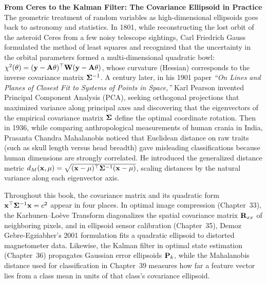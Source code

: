 \begin{applicationbox}
\textbf{From Ceres to the Kalman Filter: The Covariance Ellipsoid in Practice}
The geometric treatment of random variables as high-dimensional ellipsoids goes back to astronomy and statistics. In 1801, while reconstructing the lost orbit of the asteroid Ceres from a few noisy telescope sightings, Carl Friedrich Gauss formulated the method of least squares and recognized that the uncertainty in the orbital parameters formed a multi-dimensional quadratic bowl: $\chi^2(\mathbf{\theta}) = (\mathbf{y} - \mathbf{A}\mathbf{\theta})^\top \mathbf{W} (\mathbf{y} - \mathbf{A}\mathbf{\theta})$, whose curvature (Hessian) corresponds to the inverse covariance matrix $\mathbf{\Sigma}^{-1}$. A century later, in his 1901 paper \emph{``On Lines and Planes of Closest Fit to Systems of Points in Space,''} Karl Pearson invented Principal Component Analysis (PCA), seeking orthogonal projections that maximized variance along principal axes and discovering that the eigenvectors of the empirical covariance matrix $\mathbf{\Sigma}$ define the optimal coordinate rotation. Then in 1936, while comparing anthropological measurements of human crania in India, Prasanta Chandra Mahalanobis noticed that Euclidean distance on raw traits (such as skull length versus head breadth) gave misleading classifications because human dimensions are strongly correlated. He introduced the generalized distance metric $d_M(\mathbf{x},\mathbf{\mu}) = \sqrt{(\mathbf{x}-\mathbf{\mu})^\top \mathbf{\Sigma}^{-1} (\mathbf{x}-\mathbf{\mu})}$, scaling distances by the natural variance along each eigenvector axis.

Throughout this book, the covariance matrix and its quadratic form $\mathbf{x}^\top \mathbf{\Sigma}^{-1} \mathbf{x} = c^2$ appear in four places. In optimal image compression (Chapter~33), the Karhunen--Lo\`{e}ve Transform diagonalizes the spatial covariance matrix $\mathbf{R}_{xx}$ of neighboring pixels, and in ellipsoid sensor calibration (Chapter~35), Demoz Gebre-Egziabher's 2001 formulation fits a quadratic ellipsoid to distorted magnetometer data. Likewise, the Kalman filter in optimal state estimation (Chapter~36) propagates Gaussian error ellipsoids $\mathbf{P}_k$, while the Mahalanobis distance used for classification in Chapter~39 measures how far a feature vector lies from a class mean in units of that class's covariance ellipsoid.
\end{applicationbox}

